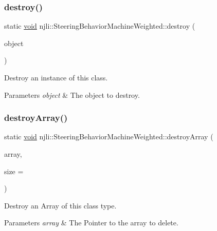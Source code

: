 \subsubsection{\texorpdfstring{destroy()}{destroy()}}
{\footnotesize\ttfamily static \mbox{\hyperlink{_thread_8h_af1e856da2e658414cb2456cb6f7ebc66}{void}} njli\+::\+Steering\+Behavior\+Machine\+Weighted\+::destroy (\begin{DoxyParamCaption}\item[{\mbox{\hyperlink{classnjli_1_1_steering_behavior_machine_weighted}{Steering\+Behavior\+Machine\+Weighted}} $\ast$}]{object }\end{DoxyParamCaption})\hspace{0.3cm}{\ttfamily [static]}}

Destroy an instance of this class.


\begin{DoxyParams}{Parameters}
{\em object} & The object to destroy. \\
\hline
\end{DoxyParams}
\mbox{\label{classnjli_1_1_steering_behavior_machine_weighted_a5d91176f80ad5e3dd7a5d56383f9d013}} 
\subsubsection{\texorpdfstring{destroy\+Array()}{destroyArray()}}
{\footnotesize\ttfamily static \mbox{\hyperlink{_thread_8h_af1e856da2e658414cb2456cb6f7ebc66}{void}} njli\+::\+Steering\+Behavior\+Machine\+Weighted\+::destroy\+Array (\begin{DoxyParamCaption}\item[{\mbox{\hyperlink{classnjli_1_1_steering_behavior_machine_weighted}{Steering\+Behavior\+Machine\+Weighted}} $\ast$$\ast$}]{array,  }\item[{const \mbox{\hyperlink{_util_8h_a10e94b422ef0c20dcdec20d31a1f5049}{u32}}}]{size = {} }\end{DoxyParamCaption})\hspace{0.3cm}{\ttfamily [static]}}

Destroy an Array of this class type.


\begin{DoxyParams}{Parameters}
{\em array} & The Pointer to the array to delete. \\
\hline
\end{DoxyParams}
\mbox{\label{classnjli_1_1_steering_behavior_machine_weighted_a96746378cde3e401742eda55cbe5b23c}} 
